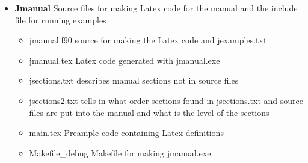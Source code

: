 \begin{itemize}
\begin{itemize}
\item \href{run:./jexamples.txt }{jexamples.txt} \hspace{0.2cm}include file which can be used to run all examples in the manual 
and which is generated with jmanual.exe 
\item \href{run:./cdat.txt}{cdat.txt} \hspace{0.2cm}example unit data file for small \textcolor{VioletRed}{jlp}() example in jexample.txt. 
\item xdat.txt\hspace{0.2cm}example schedule file for small \textcolor{VioletRed}{jlp}() example 
\item \href{run:./jlp92.pdf}{jlp92.pdf} \hspace{0.2cm}Manual of old JLP which explains the theory behind the jlp algorithm 
\item \href{run:./lappilempinen.pdf}{lappilempinen.pdf} \hspace{0.2cm} Paper explaining the theory behing factory optimization. 
\item \href{run:./hyvonenetal2019.pdf}{hyvonenetal2019.pdf} \hspace{0.2cm} A paper utilizing the factory optimization. 
\item \href{run:./JLp22development.docx} {\textbf{Jlp22}development.docx} \hspace{0.2cm} not up-to-date manual for developers 
\item \href{run:./fletcher.pdf}{fletcher.pdf} The theory behind the subroutines of Fletcher 
\end{itemize} 
 
\item \textbf{Jmanual} \hspace{0.2cm} Source files for making Latex code for 
the manual and the include file for running examples 
\begin{itemize} 
\item jmanual.f90 \hspace{0.2cm}source for making the Latex code and jexamples.txt 
\item jmanual.tex \hspace{0.2cm}Latex code generated with jmanual.exe 
\item jsections.txt \hspace{0.2cm}describes manual sections not in source files 
\item jsections2.txt \hspace{0.2cm}tells in what order sections found in jsections.txt 
and source files are put into the manual and what is the level of the sections 
\item main.tex  \hspace{0.2cm}Preample code containing Latex definitions 
\item Makefile\_debug \hspace{0.2cm}Makefile for making jmanual.exe 
\end{itemize} 
 

\end{itemize}
